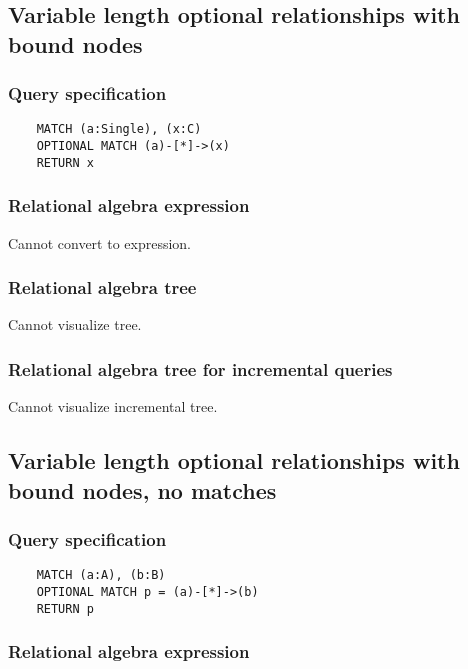 	\subsection{Variable length optional relationships with bound nodes}

	\subsubsection*{Query specification}

	\begin{lstlisting}
	MATCH (a:Single), (x:C)
	OPTIONAL MATCH (a)-[*]->(x)
	RETURN x
	\end{lstlisting}


	\subsubsection*{Relational algebra expression}

	Cannot convert to expression.

	\subsubsection*{Relational algebra tree}

	Cannot visualize tree.

	\subsubsection*{Relational algebra tree for incremental queries}

	Cannot visualize incremental tree.
	\subsection{Variable length optional relationships with bound nodes, no matches}

	\subsubsection*{Query specification}

	\begin{lstlisting}
	MATCH (a:A), (b:B)
	OPTIONAL MATCH p = (a)-[*]->(b)
	RETURN p
	\end{lstlisting}


	\subsubsection*{Relational algebra expression}

